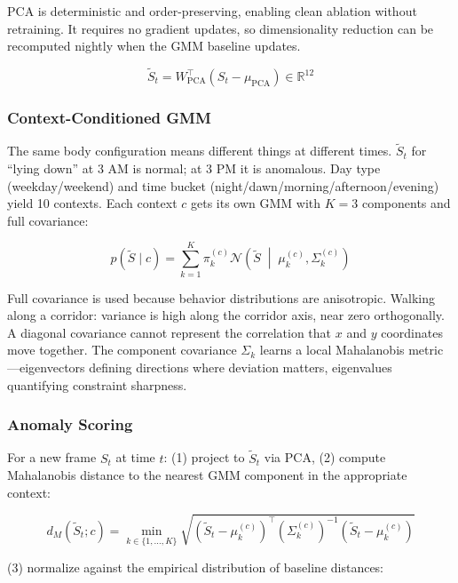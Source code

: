 \documentclass[11pt,a4paper]{article}
\begin{document}
PCA is deterministic and order-preserving, enabling clean ablation without retraining.
It requires no gradient updates, so dimensionality reduction can be recomputed nightly when the GMM baseline updates.

\begin{equation}
\tilde{S}_t = W_{\text{PCA}}^\top (S_t - \mu_{\text{PCA}}) \in \mathbb{R}^{12}
\end{equation}

\subsubsection{Context-Conditioned GMM}

The same body configuration means different things at different times.
$\tilde{S}_t$ for ``lying down'' at 3 AM is normal; at 3 PM it is anomalous.
Day type (weekday/weekend) and time bucket (night/dawn/morning/afternoon/evening) yield 10 contexts.
Each context $c$ gets its own GMM with $K{=}3$ components and full covariance:

\begin{equation}
p(\tilde{S} \mid c) = \sum_{k=1}^{K} \pi_k^{(c)} \mathcal{N}\!\left(\tilde{S} \;\middle|\; \mu_k^{(c)}, \Sigma_k^{(c)}\right)
\end{equation}

Full covariance is used because behavior distributions are anisotropic.
Walking along a corridor: variance is high along the corridor axis, near zero orthogonally.
A diagonal covariance cannot represent the correlation that $x$ and $y$ coordinates move together.
The component covariance $\Sigma_k$ learns a local Mahalanobis metric---eigenvectors defining directions where deviation matters, eigenvalues quantifying constraint sharpness.

\subsubsection{Anomaly Scoring}

For a new frame $S_t$ at time $t$: (1) project to $\tilde{S}_t$ via PCA, (2) compute Mahalanobis distance to the nearest GMM component in the appropriate context:

\begin{equation}
d_M(\tilde{S}_t; c) = \min_{k \in \{1,\dots,K\}} \sqrt{(\tilde{S}_t - \mu_k^{(c)})^\top (\Sigma_k^{(c)})^{-1} (\tilde{S}_t - \mu_k^{(c)})}
\end{equation}

(3) normalize against the empirical distribution of baseline distances:
\end{document}
